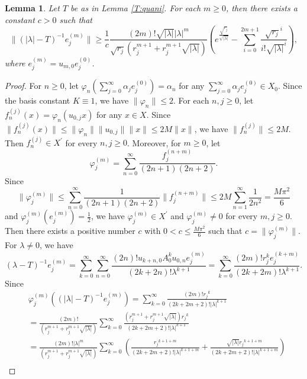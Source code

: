 \documentclass[12pt]{amsart}
\numberwithin{equation}{section}
\theoremstyle{plain}
\newtheorem{lem}[thm]{Lemma}
\theoremstyle{definition}
\renewcommand{\phi}{\varphi}
\begin{document}
\begin{lem}\label{T:normvector}
Let $T$ be as in Lemma \ref{T:quani}.
For each $m\geq 0$, then there exists a constant $c>0$ such that
\begin{equation}\label{T:ej}
\|(|\lambda|-T)^{-1}e_j^{(m)}\|\geq
\frac{1}{c}\frac{(2m)!\sqrt{|\lambda|}|\lambda|^{m}}{\sqrt{r_j}(r_j^{m+1}+r_j^{m+1}\sqrt{|\lambda|})}
\left(e^{\frac{\sqrt{r_j}}{\sqrt{|\lambda|}}}-\sum_{i=0}^{2m+1}\frac{\sqrt{r_j}^i}{i!\sqrt{|\lambda|}^{i}}\right),
\end{equation}
where $e_j^{(m)}=u_{m,0}e_{j}^{(0)}$.
\end{lem}
\begin{proof}
For $n\geq 0$, let $\phi_n (\sum_{j=0}^{\infty}\alpha_j e_j^{(0)})=\alpha_n$ for any $\sum_{j=0}^{\infty}\alpha_j e_j^{(0)}\in X_0$.
Since the basis constant $K\equiv1$, we have $\|\phi_n\|\leq2$.
For each $n,j\geq 0$, let $f_n^{(j)}(x)=\phi_n(u_{0,j}x)$ for any $x\in X$.
Since $\|f_n^{(j)}(x)\|\leq \|\phi_n\|\|u_{0,j}\|\|x\|\leq 2M \|x\|$,
we have $\|f_n^{(j)}\|\leq 2M$.
Then $f_n^{(j)}\in X^{\prime}$ for every $n,j\geq 0$.
Moreover, for $m\geq 0$,
let
$$\varphi_j^{(m)}=\sum_{n=0}^{\infty}\frac{f_j^{(n+m)}}{(2n+1)(2n+2)}.$$
Since
$$\|\varphi_j^{(m)}\|\leq \sum_{n=0}^{\infty}\frac{1}{(2n+1)(2n+2)}\|f_j^{(n+m)}\|
\leq 2M\sum_{n=1}^{\infty}\frac{1}{2n^2}=\frac{M\pi^2}{6}$$
and $\varphi_j^{(m)}(e_{j}^{(m)})=\frac{1}{2}$, we have $\varphi_j^{(m)}\in X^{\prime}$ and $\varphi_j^{(m)}\neq 0$ for every $m,j\geq 0$.
Then there exists a positive number $c$ with $0<c\leq\frac{M\pi^2}{6}$ such that $c=\|\varphi_j^{(m)}\|$.
For $\lambda\neq 0$, we have
\begin{equation*}\label{T:norej}
(\lambda-T)^{-1}e_j^{(m)}
=\sum_{k=0}^{\infty}\sum_{n=0}^{\infty}\frac{(2n)!u_{k+n,0}A_0^ku_{0,n}e_j^{(m)}}{(2k+2n)!\lambda^{k+1}}
=\sum_{k=0}^{\infty}\frac{(2m)!r_j^k e_j^{(k+m)}}{(2k+2m)!\lambda^{k+1}}.
\end{equation*}
Since
\begin{align*}
&\varphi_j^{(m)}\left((|\lambda|-T)^{-1}e_j^{(m)}\right)
=\sum\limits_{k=0}^{\infty}\frac{(2m)!{r_j}^k}{(2k+2m+2)!|\lambda|^{k+1}}\\
&=\frac{(2m)!}{(r_j^{m+1}+r_j^{m+1}\sqrt{|\lambda|})}
\sum\limits_{k=0}^{\infty}\frac{(r_j^{m+1}+r_j^{m+1}\sqrt{|\lambda|}){r_j}^k}{(2k+2m+2)!|\lambda|^{k+1}}\\
&=\frac{(2m)!|\lambda|^{m}}{(r_j^{m+1}+r_j^{m+1}\sqrt{|\lambda|})}
\sum\limits_{k=0}^{\infty}\left(\frac{{r_j}^{k+1+m}}{(2k+2m+2)!|\lambda|^{k+1+m}}
+\frac{\sqrt{|\lambda|}{r_j}^{k+1+m}}{(2k+2m+2)!|\lambda|^{k+1+m}}\right)\\

\end{align*}
\end{proof}
\end{document}
